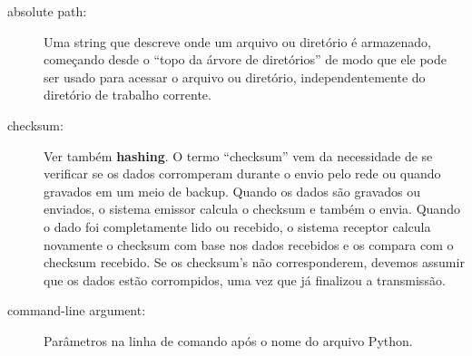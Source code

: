 \begin{description}

\item[absolute path:] Uma string que descreve onde um arquivo ou
diretório é armazenado, começando desde o ``topo da árvore de diretórios''
de modo que ele pode ser usado para acessar o arquivo ou diretório, independentemente
do diretório de trabalho corrente.

\item [checksum:] Ver também {\bf hashing}. O termo ``checksum''
vem da necessidade de se verificar se os dados corromperam durante
o envio pelo rede ou quando gravados em um meio de backup. 
Quando os dados são gravados ou enviados, o sistema emissor
calcula o checksum e também o envia. Quando o dado foi
completamente lido ou recebido, o sistema receptor calcula novamente
o checksum com base nos dados recebidos e os compara com o
checksum recebido. Se os checksum's não corresponderem, devemos
assumir que os dados estão corrompidos, uma vez que já finalizou a transmissão.

\item[command-line argument:] Parâmetros na linha de comando após o nome do arquivo Python.


\end{description}

